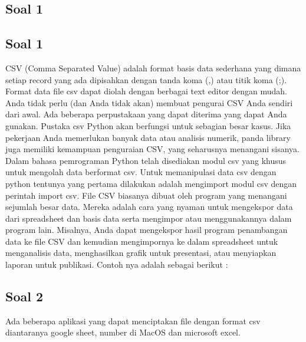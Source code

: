 \subsection{Soal 1}
\begin{enumerate}
\subsection{Soal 1}
 CSV (Comma Separated Value) adalah format basis data sederhana yang dimana setiap record yang ada dipisahkan dengan tanda koma (,) atau titik koma (;). Format data file csv dapat diolah dengan berbagai text editor dengan mudah. Anda tidak perlu (dan Anda tidak akan) membuat pengurai CSV Anda sendiri dari awal. Ada beberapa perpustakaan yang dapat diterima yang dapat Anda gunakan. Pustaka csv Python akan berfungsi untuk sebagian besar kasus. Jika pekerjaan Anda memerlukan banyak data atau analisis numerik, panda library juga memiliki kemampuan penguraian CSV, yang seharusnya menangani sisanya. Dalam bahasa pemrograman Python telah disediakan modul csv yang khusus untuk mengolah data berformat csv.  Untuk memanipulasi data csv dengan python tentunya yang pertama dilakukan adalah mengimport modul csv dengan perintah import csv. File CSV biasanya dibuat oleh program yang menangani sejumlah besar data. Mereka adalah cara yang nyaman untuk mengekspor data dari spreadsheet dan basis data serta mengimpor atau menggunakannya dalam program lain. Misalnya, Anda dapat mengekspor hasil program penambangan data ke file CSV dan kemudian mengimpornya ke dalam spreadsheet untuk menganalisis data, menghasilkan grafik untuk presentasi, atau menyiapkan laporan untuk publikasi. Contoh nya adalah sebagai berikut :

 

\subsection{Soal 2}
 Ada beberapa aplikasi yang dapat menciptakan file dengan format csv diantaranya google sheet, number di MacOS dan microsoft excel.


\end{enumerate}
